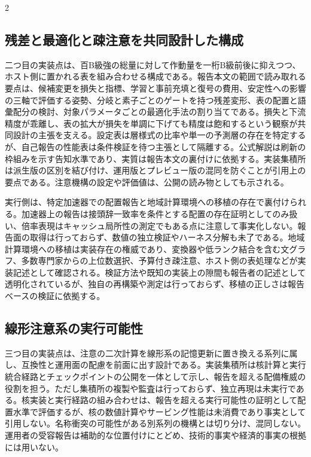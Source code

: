 \documentclass[lualatex,a4paper,10pt]{jlreq}
\begin{document}
\begin{multicols}{2}
\subsection{残差と最適化と疎注意を共同設計した構成}
二つ目の実装点は、百B級強の総量に対して作動量を一桁B級前後に抑えつつ、ホスト側に置かれる表を組み合わせる構成である\autocite{qwen38next}。報告本文の範囲で読み取れる要点は、候補変更を損失と指標、学習と事前充填と復号の費用、安定性への影響の三軸で評価する姿勢、分岐と素子ごとのゲートを持つ残差変形、表の配置と語彙配分の検討、対象パラメータごとの最適化手法の割り当てである。損失と下流精度が乖離し、表の拡大が損失を単調に下げても精度は飽和するという観察が共同設計の主張を支える。設定表は層様式の比率や単一の予測層の存在を特定するが、自己報告の性能表は条件検証を待つ主張として隔離する。公式解説は刷新の枠組みを示す告知水準であり、実質は報告本文の裏付けに依拠する\autocite{qwenblog}。実装集積所は派生版の区別を結び付け、運用版とプレビュー版の混同を防ぐことが引用上の要点である\autocite{qwen38repo}。注意機構の設定や評価値は、公開の読み物としても示される\autocite{qwenreadme}。

実行側は、特定加速器での配置報告と地域計算環境への移植の存在で裏付けられる。加速器上の報告は接頭辞一致率を条件とする配置の存在証明としてのみ扱い、倍率表現はキャッシュ局所性の測定でもある点に注意して事実化しない\autocite{nvblogqwen}。報告面の取得は行っておらず、数値の独立検証やハーネス分解も未了である。地域計算環境への移植は実装存在の権威であり、変換器や低ランク結合を含む文グラフ、多数専門家からの上位数選択、予算付き疎注意、ホスト側の表処理などが実装記述として確認される\autocite{qwenpr}。検証方法や既知の実装上の隙間も報告者の記述として透明化されているが、独自の再構築や測定は行っておらず、移植の正しさは報告ベースの検証に依拠する。

\subsection{線形注意系の実行可能性}
三つ目の実装点は、注意の二次計算を線形系の記憶更新に置き換える系列に属し、互換性と運用面の配慮を前面に出す設計である。実装集積所は核計算と実行統合経路とチェックポイントの公開を一体として示し、報告を超える配備権威の役割を担う\autocite{kimigithub}。ただし集積所の複製や監査は行っておらず、独立再現は未実行である。核実装と実行経路の組み合わせは、報告を超える実行可能性の証明として配置水準で評価するが\autocite{kda}、核の数値計算やサービング性能は未消費であり事実として引用しない。名称衝突の可能性がある別系列の機構とは切り分け、混同しない。運用者の受容報告は補助的な位置付けにとどめ、技術的事実や経済的事実の根拠には用いない。


\end{multicols}
\end{document}
